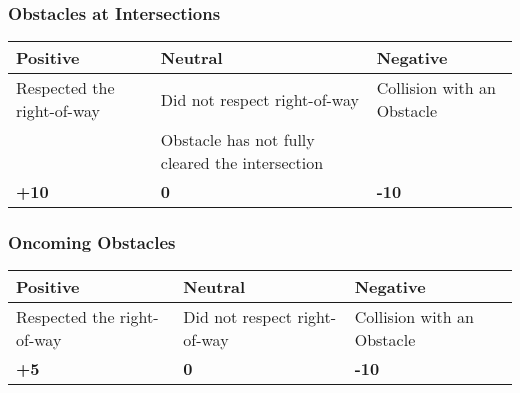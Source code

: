 {	\begin{highlight}
		\subsubsection*{Obstacles at Intersections}
		\begin{table}[H]
			\begin{tabularx}{\textwidth}{XXX}
				\toprule
				\textbf{Positive}          & \textbf{Neutral}                                & \textbf{Negative}          \\
				\midrule
				Respected the right-of-way \footnotemark[2] & Did not respect right-of-way \footnotemark[2]                    & Collision with an Obstacle \\
				                           & Obstacle has not fully cleared the intersection &                            \\
				\topstrut
				\textbf{+10}               & \textbf{0}                                      & \textbf{-10}               \\
				\bottomrule
			\end{tabularx}
		\end{table}

		\subsubsection*{Oncoming Obstacles}
		\begin{table}[H]
			\begin{tabularx}{\textwidth}{XXX}
				\toprule
				\textbf{Positive}                           & \textbf{Neutral}             & \textbf{Negative}          \\
				\midrule
				Respected the right-of-way \footnotemark[2] & Did not respect right-of-way \footnotemark[2] & Collision with an Obstacle \\
				\topstrut
				\textbf{+5}                                 & \textbf{0}                   & \textbf{-10}               \\
				\bottomrule
			\end{tabularx}
		\end{table}

		\newpage


\end{highlight}}

